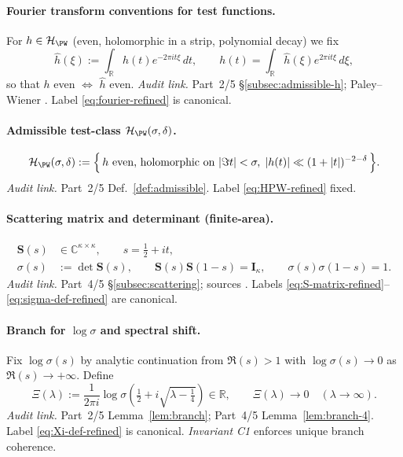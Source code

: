 \paragraph{Fourier transform conventions for test functions.}
For $h\in\mathcal H_{\PW}$ (even, holomorphic in a strip, polynomial decay) we fix
\begin{equation}
  \hat h(\xi) := \int_{\mathbb R} h(t) e^{-2\pi i t \xi}\,dt, \qquad
  h(t) = \int_{\mathbb R} \hat h(\xi) e^{2\pi i t \xi}\,d\xi,
  \label{eq:fourier-refined}
\end{equation}
so that $h$ even $\Leftrightarrow$ $\hat h$ even.
\textit{Audit link.} Part~2/5 \S\ref{subsec:admissible-h}; Paley–Wiener \cite{PaleyWiener1934}. Label \eqref{eq:fourier-refined} is canonical.

\paragraph{Admissible test-class $\mathcal H_{\PW}(\sigma,\delta)$.}
\begin{equation}
  \mathcal H_{\PW}(\sigma,\delta)
  := \Big\{\, h \text{ even, holomorphic on } |\Im t|<\sigma,\; |h(t)|\ll (1+|t|)^{-2-\delta} \,\Big\} .
  \label{eq:HPW-refined}
\end{equation}
\textit{Audit link.} Part~2/5 Def.~\ref{def:admissible}. Label \eqref{eq:HPW-refined} fixed.

\paragraph{Scattering matrix and determinant (finite-area).}
\begin{align}
  \mathbf S(s) &\in \mathbb C^{\kappa\times\kappa}, \qquad s=\tfrac12+it, \label{eq:S-matrix-refined} \\
  \sigma(s) &:= \det \mathbf S(s), \qquad \mathbf S(s)\mathbf S(1-s)=\mathbf I_\kappa,\qquad \sigma(s)\sigma(1-s)=1.
  \label{eq:sigma-def-refined}
\end{align}
\textit{Audit link.} Part~4/5 \S\ref{subsec:scattering}; sources \cite{Hejhal1983II,LaxPhillips1976}. Labels \eqref{eq:S-matrix-refined}–\eqref{eq:sigma-def-refined} are canonical.

\paragraph{Branch for $\log \sigma$ and spectral shift.}
Fix $\log \sigma(s)$ by analytic continuation from $\Re(s)>1$ with $\log \sigma(s)\to 0$ as $\Re(s)\to +\infty$. Define
\begin{equation}
  \Xi(\lambda) := \frac{1}{2\pi i}\log \sigma\!\left(\tfrac12 + i\sqrt{\lambda-\tfrac14}\right) \in \mathbb R, \qquad
  \Xi(\lambda)\to 0 \quad (\lambda\to\infty).
  \label{eq:Xi-def-refined}
\end{equation}
\textit{Audit link.} Part~2/5 Lemma~\ref{lem:branch}; Part~4/5 Lemma~\ref{lem:branch-4}. Label \eqref{eq:Xi-def-refined} is canonical. \emph{Invariant C1} enforces unique branch coherence.

